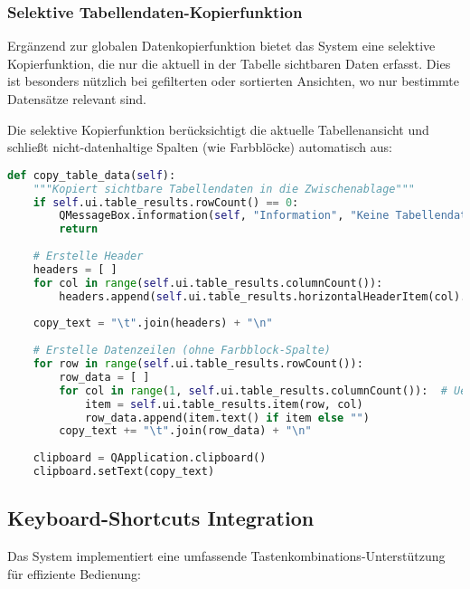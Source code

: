 \subsubsection{Selektive Tabellendaten-Kopierfunktion}

Ergänzend zur globalen Datenkopierfunktion bietet das System eine selektive Kopierfunktion, die nur die aktuell in der Tabelle sichtbaren Daten erfasst. Dies ist besonders nützlich bei gefilterten oder sortierten Ansichten, wo nur bestimmte Datensätze relevant sind.

Die selektive Kopierfunktion berücksichtigt die aktuelle Tabellenansicht und schließt nicht-datenhaltige Spalten (wie Farbblöcke) automatisch aus:

\begin{lstlisting}[language=Python, caption=Tabellendaten-Kopierfunktion]
def copy_table_data(self):
    """Kopiert sichtbare Tabellendaten in die Zwischenablage"""
    if self.ui.table_results.rowCount() == 0:
        QMessageBox.information(self, "Information", "Keine Tabellendaten verfuegbar.")
        return
    
    # Erstelle Header
    headers = [ ]
    for col in range(self.ui.table_results.columnCount()):
        headers.append(self.ui.table_results.horizontalHeaderItem(col).text())
    
    copy_text = "\t".join(headers) + "\n"
    
    # Erstelle Datenzeilen (ohne Farbblock-Spalte)
    for row in range(self.ui.table_results.rowCount()):
        row_data = [ ]
        for col in range(1, self.ui.table_results.columnCount()):  # Ueberspringe Farbblock
            item = self.ui.table_results.item(row, col)
            row_data.append(item.text() if item else "")
        copy_text += "\t".join(row_data) + "\n"
    
    clipboard = QApplication.clipboard()
    clipboard.setText(copy_text)
\end{lstlisting}

\subsection{Keyboard-Shortcuts Integration}

Das System implementiert eine umfassende Tastenkombinations-Unterstützung für effiziente Bedienung:

